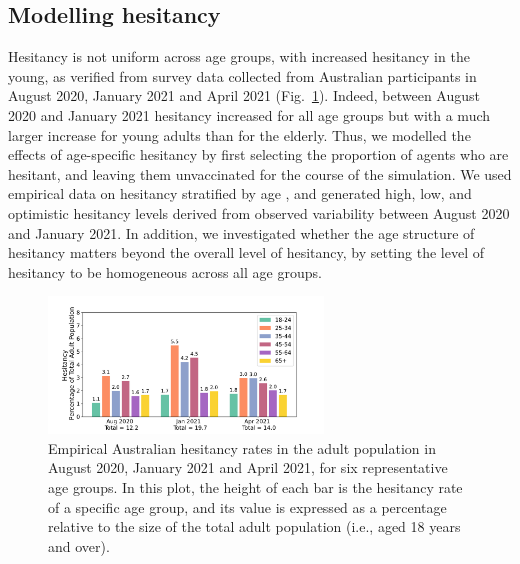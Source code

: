 \documentclass[article, a4, authoryear]{elsarticle}
\begin{document}
\subsection{Modelling hesitancy}
Hesitancy is not uniform across age groups, with increased hesitancy in the young, as verified from survey data collected from Australian participants in August 2020, January 2021 and April 2021 \cite{biddle_change_2021} (Fig.~\ref{fig:hesitancy_per_age}). Indeed, between August 2020 and January 2021 hesitancy increased for all age groups but with a much larger increase for young adults than for the elderly. Thus, we modelled the effects of age-specific hesitancy by first selecting the proportion of agents who are hesitant, and leaving them unvaccinated for the course of the simulation. We used empirical data on hesitancy stratified by age \cite{biddle_change_2021}, and generated high, low, and optimistic hesitancy levels derived from observed variability between August 2020 and January 2021. In addition, we  investigated whether the age structure of hesitancy matters beyond the overall level of hesitancy, by setting the level of hesitancy to be homogeneous across all age groups.

\begin{figure}[ht]
    \centering
    \includegraphics[width=0.65\textwidth]{figures/fig03_Hesitancy_Spec_vs_NonSpec.pdf} 
    \caption{Empirical Australian hesitancy rates in the adult population \cite{biddle_change_2021} in August 2020, January 2021 and April 2021, for six representative age groups. In this plot, the height of each bar is the hesitancy rate of a specific age group, and its value is expressed as a percentage relative to the size of the total adult population (i.e., aged 18 years and over).}
    \label{fig:hesitancy_per_age}
\end{figure}
\end{document}
